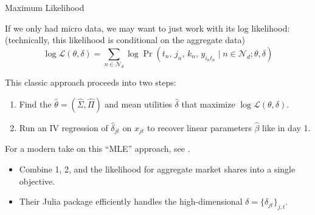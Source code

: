 \documentclass[aspectratio=169,t,11pt,table]{beamer}
\begin{document}
\begin{frame}{Maximum Likelihood}
    \begin{wideitemize}
        \item If we only had micro data, we may want to just work with its log likelihood: \\
        (technically, this likelihood is conditional on the aggregate data)
        \begin{equation*}
            \log\mathcal{L}(\theta, \delta) = \sum_{n \in \mathcal{N}_d} \log \Pr(t_n, \, j_n, \, k_n, \, y_{i_nt_n} \mid n \in \mathcal{N}_d; \theta, \delta)
        \end{equation*}
        \vspace{-1em}
        \pause
        \item This classic approach proceeds into two steps:
        \pause
        \begin{enumerate}
            \item Find the $\hat{\theta} = (\hat{\Sigma}, \hat{\Pi})$ and mean utilities $\hat{\delta}$ that maximize $\log\mathcal{L}(\theta, \delta)$.
            \pause
            \item Run an IV regression of $\hat{\delta}_{jt}$ on $x_{jt}$ to recover linear parameters $\hat{\beta}$ like in day 1.
        \end{enumerate}
        \pause
        \item For a modern take on this ``MLE'' approach, see \cite*{grieco2022conformant}.
        \begin{itemize}
            \item Combine 1, 2, and the likelihood for aggregate market shares into a single objective.
            \item Their Julia package efficiently handles the high-dimensional $\delta = \{\delta_{jt}\}_{j,t}$.
        \end{itemize}
    \end{wideitemize}
\end{frame}
\end{document}
